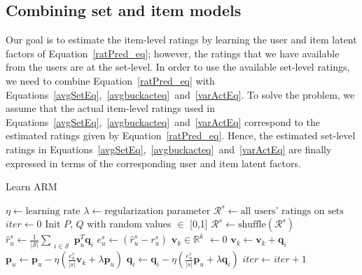 \subsection{Combining set and item models}


Our goal is to estimate the item-level ratings by learning the user and item
latent factors of Equation~\ref{ratPred_eq}; however, the ratings that we have available
from the users are at the set-level. In order to use the available set-level
ratings, we need to combine 
Equation~\ref{ratPred_eq} with
Equations~\ref{avgSetEq},~\ref{avgbuckacteq}~and~\ref{varActEq}. To solve the problem, we assume that the actual
item-level ratings used in Equations~\ref{avgSetEq},~\ref{avgbuckacteq}~and~\ref{varActEq} correspond to the estimated ratings
given by Equation~\ref{ratPred_eq}. Hence, the estimated set-level ratings in
Equations~\ref{avgSetEq},~\ref{avgbuckacteq}~and~\ref{varActEq}
are finally expressed in terms of the corresponding user and item latent
factors.

\begin{algorithm}
  \caption{Learn ARM}
  \label{alg:alg-lfs-arm}
  \begin{algorithmic}[1]
    \State $\eta \gets  \text{learning rate}$
    \State $\lambda \gets \text{regularization parameter}$
    \State $\mathcal{R}^s \gets \text{all users' ratings on sets}$  
    \State $iter \gets 0$
    \State Init $P$, $Q$ with random values $\in$ [0,1] 
      \State $\mathcal{R}^s \gets \text{shuffle}(\mathcal{R}^s)$
        \State $\hat{r}_{u}^s \gets  \frac{1}{|\mathcal{S}|} \sum_{\substack{i
        \in \mathcal{S}}} \bm{p}_u^T\bm{q}_i$ 
        \State $e_{u}^s \gets (\hat{r}_{u}^s - r_{u}^s)$
        \State $\bm{v}_k \in \mathbb{R}^k$  $\gets 0$
        \State $\bm{v}_k \gets \bm{v}_k + \bm{q}_i$
        \EndFor
        \State $\bm{p}_u \gets \bm{p}_u - \eta(\frac{e_{u}^s}{|s|} \bm{v}_k +
        \lambda \bm{p}_u)$ 
          \State $\bm{q}_i \gets \bm{q}_i - \eta(\frac{e_{u}^s}{|s|} \bm{p}_u +
            \lambda \bm{q}_i)$  
        \EndFor
      \EndFor
      \State $iter \gets iter + 1$
    \EndWhile
    \EndProcedure
  \end{algorithmic}
\end{algorithm}


